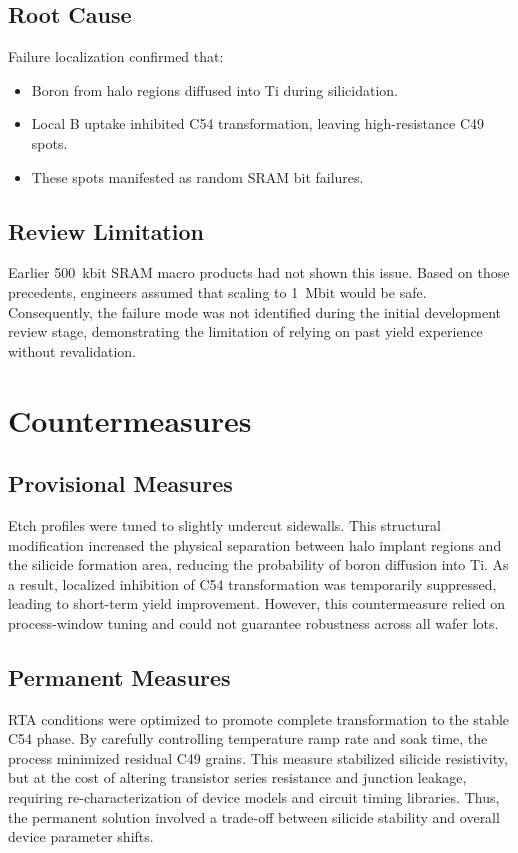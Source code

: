 \documentclass[conference]{IEEEtran}
\begin{document}
\subsection{Root Cause}
Failure localization confirmed that:
\begin{itemize}
    \item Boron from halo regions diffused into Ti during silicidation.
    \item Local B uptake inhibited C54 transformation, leaving high-resistance C49 spots.
    \item These spots manifested as random SRAM bit failures.
\end{itemize}

\subsection{Review Limitation}
Earlier 500~kbit SRAM macro products had not shown this issue. Based on those precedents, engineers assumed that scaling to 1~Mbit would be safe.  
Consequently, the failure mode was not identified during the initial development review stage, demonstrating the limitation of relying on past yield experience without revalidation.

\section{Countermeasures}
\subsection{Provisional Measures}
Etch profiles were tuned to slightly undercut sidewalls.  
This structural modification increased the physical separation between halo implant regions and the silicide formation area, reducing the probability of boron diffusion into Ti.  
As a result, localized inhibition of C54 transformation was temporarily suppressed, leading to short-term yield improvement.  
However, this countermeasure relied on process-window tuning and could not guarantee robustness across all wafer lots.

\subsection{Permanent Measures}
RTA conditions were optimized to promote complete transformation to the stable C54 phase.  
By carefully controlling temperature ramp rate and soak time, the process minimized residual C49 grains.  
This measure stabilized silicide resistivity, but at the cost of altering transistor series resistance and junction leakage, requiring re-characterization of device models and circuit timing libraries.  
Thus, the permanent solution involved a trade-off between silicide stability and overall device parameter shifts.
\end{document}
